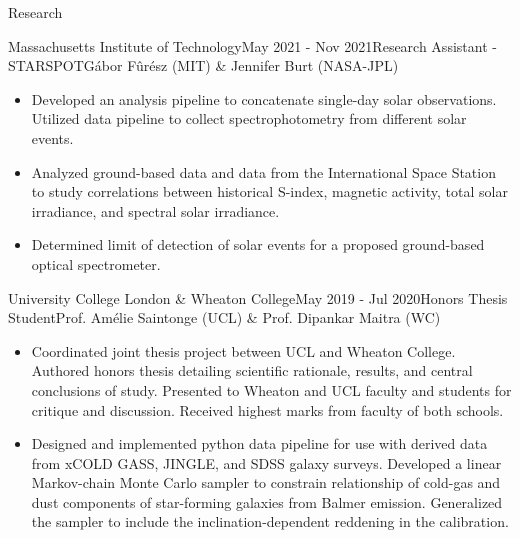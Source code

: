 \documentclass{resume} %
\begin{document}
\begin{rSection}{Research}
\begin{rSubsection}{Massachusetts Institute of Technology}{May 2021 - Nov 2021}{Research Assistant - STARSPOT}{G\'abor F\^ur\'esz (MIT) \& Jennifer Burt (NASA-JPL)}
\begin{itemize}
\item Developed an analysis pipeline to concatenate single-day solar observations. Utilized data pipeline to collect spectrophotometry from different solar events.
\item Analyzed ground-based data and data from the International Space Station to study correlations between historical S-index, magnetic activity, total solar irradiance, and spectral solar irradiance.
\item Determined limit of detection of solar events for a proposed ground-based optical spectrometer.
\end{itemize}
\end{rSubsection}

\begin{rSubsection}{University College London \& Wheaton College}{May 2019 - Jul 2020}{Honors Thesis Student}{Prof. Am\'{e}lie Saintonge (UCL) \& Prof. Dipankar Maitra (WC)}
\begin{itemize}
\item Coordinated joint thesis project between UCL and Wheaton College. Authored honors thesis detailing scientific rationale, results, and central conclusions of study. Presented to Wheaton and UCL faculty and students for critique and discussion. Received highest marks from faculty of both schools.
\item Designed and implemented python data pipeline for use with derived data from xCOLD GASS, JINGLE, and SDSS galaxy surveys. Developed a linear Markov-chain Monte Carlo sampler to constrain relationship of cold-gas and dust components of star-forming galaxies from Balmer emission. Generalized the sampler to include the inclination-dependent reddening in the calibration.
\end{itemize}
\end{rSubsection}


\end{rSection}
\end{document}
